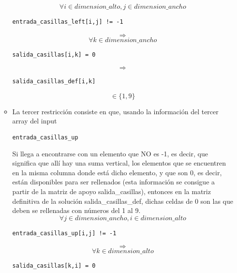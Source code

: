 \documentclass[12pt]{article}
\begin{document}
\begin{itemize}
\begin{itemize}
\begin{equation*}
\forall i \in dimension\_alto, j \in dimension\_ancho
\end{equation*}
\begin{verbatim}
entrada_casillas_left[i,j] != -1
\end{verbatim}
\begin{equation*}
\Rightarrow
\end{equation*}
\begin{equation*}
\forall k \in dimension\_ancho
\end{equation*}
\begin{verbatim}
salida_casillas[i,k] = 0
\end{verbatim}
\begin{equation*}
\Rightarrow
\end{equation*}
\begin{verbatim}
salida_casillas_def[i,k] 
\end{verbatim}
\begin{equation*}
\in \{1,9\}
\end{equation*}
\item La tercer restricción consiste en que, usando la información del tercer array del input
\begin{verbatim}
entrada_casillas_up
\end{verbatim}
Si llega a encontrarse con un elemento que NO es -1, es decir, que significa que allí hay una suma vertical, los elementos que se encuentren en la misma columna donde está dicho elemento, y que son 0, es decir, están disponibles para ser rellenados (esta información se consigue a partir de la matriz de apoyo salida\_casillas), entonces en la matriz definitiva de la solución salida\_casillas\_def, dichas celdas de 0 son las que deben se rellenadas con números del 1 al 9.
\begin{equation*}
\forall j \in dimension\_ancho, i \in dimension\_alto
\end{equation*}
\begin{verbatim}
entrada_casillas_up[i,j] != -1
\end{verbatim}
\begin{equation*}
\Rightarrow
\end{equation*}
\begin{equation*}
\forall k \in dimension\_alto
\end{equation*}
\begin{verbatim}
salida_casillas[k,i] = 0
\end{verbatim}
\begin{equation*}

\end{equation*}
\end{itemize}
\end{itemize}
\end{document}
